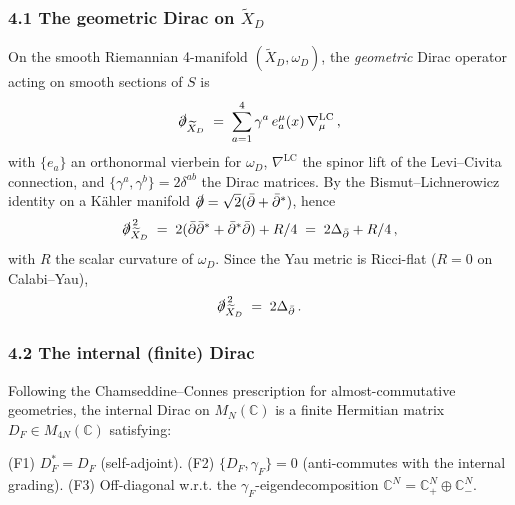 \documentclass[
  11pt,
  a4paper,
]{amsart}
\begin{document}
\hypertarget{the-geometric-dirac-on-widetildex_d}{%
\subsubsection{\texorpdfstring{4.1 The geometric Dirac on \(\widetilde{X}_D\)}{4.1 The geometric Dirac on \textbackslash widetilde\{X\}\_D}}\label{the-geometric-dirac-on-widetildex_d}}

On the smooth Riemannian 4-manifold \((\widetilde{X}_D, \omega_D)\), the \emph{geometric}
Dirac operator acting on smooth sections of \(S\) is
\begin{equation}\label{eq:dirac-geo}
\slashed{\partial}_{\widetilde{X}_D} \;=\; \sum_{a=1}^{4} \gamma^a\, e_a^\mu(x)\, \nabla_\mu^{\mathrm{LC}}\,,
\end{equation}
with \(\{e_a\}\) an orthonormal vierbein for \(\omega_D\), \(\nabla^{\mathrm{LC}}\)
the spinor lift of the Levi--Civita connection, and \(\{\gamma^a, \gamma^b\} = 2\delta^{ab}\)
the Dirac matrices. By the Bismut--Lichnerowicz identity on a Kähler manifold
\(\slashed{\partial} = \sqrt{2}(\bar\partial + \bar\partial^*)\), hence
\begin{equation}\label{eq:dirac-sq}
\slashed{\partial}_{\widetilde{X}_D}^{\,2} \;=\; 2(\bar\partial \bar\partial^* + \bar\partial^* \bar\partial) + R/4 \;=\; 2\Delta_{\bar\partial} + R/4\,,
\end{equation}
with \(R\) the scalar curvature of \(\omega_D\). Since the Yau metric is Ricci-flat
(\(R = 0\) on Calabi--Yau),
\begin{equation}\label{eq:dirac-cy}
\slashed{\partial}_{\widetilde{X}_D}^{\,2} \;=\; 2\Delta_{\bar\partial}\,.
\end{equation}

\hypertarget{the-internal-finite-dirac}{%
\subsubsection{4.2 The internal (finite) Dirac}\label{the-internal-finite-dirac}}

Following the Chamseddine--Connes prescription for almost-commutative
geometries, the internal Dirac on \(M_N(\mathbb{C})\) is a finite Hermitian
matrix \(D_F \in M_{4N}(\mathbb{C})\) satisfying:

(F1) \(D_F^* = D_F\) (self-adjoint).
(F2) \(\{D_F, \gamma_F\} = 0\) (anti-commutes with the internal grading).
(F3) Off-diagonal w.r.t. the \(\gamma_F\)-eigendecomposition \(\mathbb{C}^N = \mathbb{C}^N_+ \oplus \mathbb{C}^N_-\).
\end{document}

